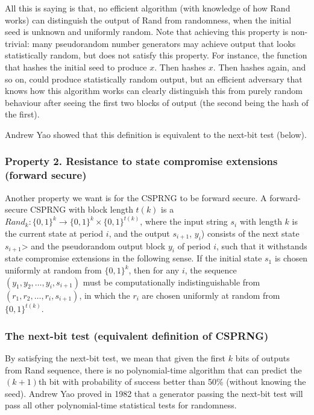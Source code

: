 \documentclass[12pt]{article}
\begin{document}
All this is saying is that, no efficient algorithm (with knowledge of how Rand works) can distinguish the output of Rand from randomness, when the initial seed is unknown and uniformly random. Note that achieving this property is non-trivial: many pseudorandom number generators may achieve output that looks statistically random, but does not satisfy this property. For instance, the function that hashes the initial seed to produce $x$. Then hashes $x$. Then hashes again, and so on, could produce statistically random output, but an efficient adversary that knows how this algorithm works can clearly distinguish this from purely random behaviour after seeing the first two blocks of output (the second being the hash of the first).

Andrew Yao showed that this definition is equivalent to the next-bit test (below).

\subsubsection*{Property 2. Resistance to state compromise extensions (forward secure)}
Another property we want is for the CSPRNG to be forward secure. A forward-secure CSPRNG with block length $t(k)$ is a $Rand_{k} \colon \{0,1\}^k \to \{0,1\}^k \times \{0,1\}^{t(k)}$, where the input string $s_i$ with length $k$ is the current state at period $i$, and the output $s_{i+1}$, $y_i$) consists of the next state $s_{i+1}$> and the pseudorandom output block $y_i$ of period $i$, such that it withstands state compromise extensions in the following sense. If the initial state $s_1$ is chosen uniformly at random from $\{0,1\}^k$, then for any $i$, the sequence $(y_1, y_2,\dots, y_i,s_{i+1})$ must be computationally indistinguishable from $(r_1,r_2,\dots,r_i,s_{i+1})$, in which the $r_i$ are chosen uniformly at random from $\{0,1\}^{t(k)}$.

\subsubsection*{The next-bit test (equivalent definition of CSPRNG)}
By satisfying the next-bit test, we mean that given the first $k$ bits of outputs from Rand sequence, there is no polynomial-time algorithm that can predict the $(k+1)$th bit with probability of success better than 50\% (without knowing the seed). Andrew Yao proved in 1982 that a generator passing the next-bit test will pass all other polynomial-time statistical tests for randomness.
\end{document}
